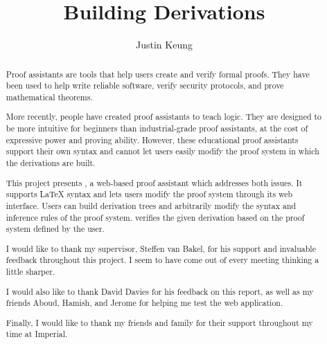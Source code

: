 \documentclass[a4paper, twoside, 11pt]{report}
\title{Building Derivations}
\author{Justin Keung}
\begin{document}


\begin{abstract}
Proof assistants are tools that help users create and verify formal proofs. They have been used to help write reliable software, verify security protocols, and prove mathematical theorems.

More recently, people have created proof assistants to teach logic. They are designed to be more intuitive for beginners than industrial-grade proof assistants, at the cost of expressive power and proving ability. However, these educational proof assistants  support their own syntax and cannot let users easily modify the proof system in which the derivations are built.

This project presents \projectname{}, a web-based proof assistant which addresses both issues. It supports \LaTeX{} syntax and lets users modify the proof system through its web interface. Users can build derivation trees and arbitrarily modify the syntax and inference rules of the proof system. \projectname{} verifies the given derivation based on the proof system defined by the user.

\end{abstract}

\renewcommand{\abstractname}{Acknowledgements}
\begin{abstract}
I would like to thank my supervisor, Steffen van Bakel, for his support and invaluable feedback throughout this project. I seem to have come out of every meeting thinking a little sharper.

I would also like to thank David Davies for his feedback on this report, as well as my friends Aboud, Hamish, and Jerome for helping me test the web application.

Finally, I would like to thank my friends and family for their support throughout my time at Imperial.
\end{abstract}

\pagestyle{toc}
\tableofcontents
\listoffigures

\pagestyle{fancy}
\clearpage
{}






% 

\DeclareRobustCommand{\VAN}[3]{#3}
\printbibliography[heading=bibintoc, title={Bibliography}]

\pagebreak

\end{document}

